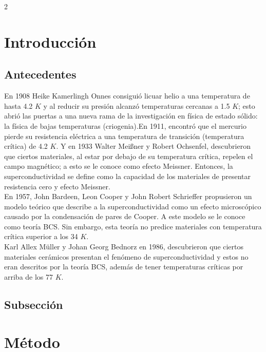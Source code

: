 \documentclass[10pt]{article}
\begin{document}
	\begin{multicols}{2}
		\section*{Introducción}%
		\subsection*{Antecedentes}
			En 1908 Heike Kamerlingh Onnes consiguió licuar helio a una temperatura de hasta 4.2 $K$ y al reducir su presión alcanzó temperaturas cercanas a 1.5 $K$; esto abrió las puertas a una nueva rama de la investigación en física de estado sólido: la física de bajas temperaturas (criogenia).En 1911, encontró que el mercurio pierde su resistencia eléctrica a una temperatura de transición (temperatura crítica) de 4.2 $K$. Y en 1933 Walter Mei{\ss}ner y Robert Ochsenfel, descubrieron que ciertos materiales, al estar por debajo de su temperatura crítica, repelen el campo magnético; a esto se le conoce como efecto Meissner. Entonces, la superconductividad se define como la capacidad de los materiales de presentar resistencia cero y efecto Meissner. \\
			En 1957, John Bardeen, Leon Cooper y John Robert Schrieffer propusieron un modelo teórico que describe a la superconductividad como un efecto microscópico causado por la condensación de pares de Cooper. A este modelo se le conoce como teoría BCS. Sin embargo, esta teoría no predice materiales con temperatura crítica superior a los 34 $K$. \\
			Karl Allex M\"uller y Johan Georg Bednorz en 1986, descubrieron que ciertos materiales cerámicos presentan el fenómeno de superconductividad y estos no eran descritos por la teoría BCS, además de tener temperaturas críticas por arriba de los 77 $K$.\cite{Referencia1}
		\subsection*{Subsección}
	        \lipsum[1]	
		\section*{Método}
			\lipsum[3] \lipsum[7]
	

\end{multicols}
\end{document}
